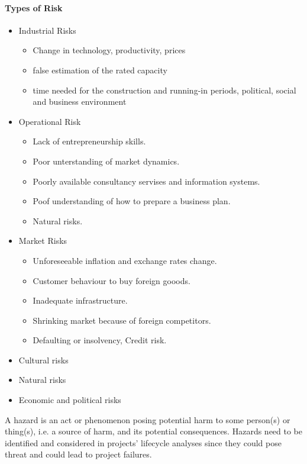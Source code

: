 \paragraph{Types of Risk}
\begin{itemize}
    \item Industrial Risks
        \begin{itemize}
            \item Change in technology, productivity, prices
            \item false estimation of the rated capacity
            \item time needed for the construction and running-in periods,
                political, social and business environment
        \end{itemize}
    \item Operational Risk
        \begin{itemize}
            \item Lack of entrepreneurship skills.
            \item Poor unterstanding of market dynamics.
            \item Poorly available consultancy servises and information systems.
            \item Poof understanding of how to prepare a business plan.
            \item Natural risks.
        \end{itemize}
    \item Market Risks
        \begin{itemize}
            \item Unforeseeable inflation and exchange rates change.
            \item Customer behaviour to buy foreign gooods.
            \item Inadequate infrastructure.
            \item Shrinking market because of foreign competitors.
            \item Defaulting or insolvency, Credit risk.
        \end{itemize}
    \item Cultural risks
    \item Natural risks
    \item Economic and political risks
\end{itemize}

\begin{definition}[Hazard]
    A hazard is an act or phenomenon posing potential harm to some person(s)
    or thing(s), i.e. a source of harm, and its potential consequences.
    Hazards need to be identified and considered in projects' lifecycle analyses
    since they could pose threat and could lead to project failures.
\end{definition}

